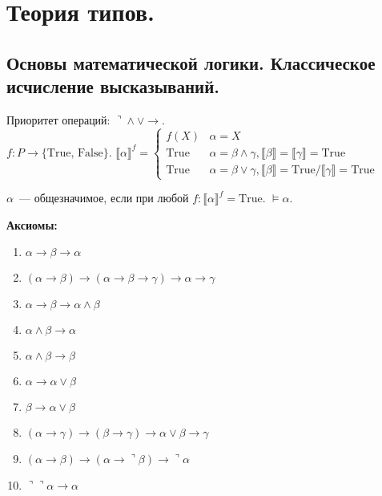 \documentclass{article}
\begin{document}
	
	
	
	
	\newpage
	\section{Теория типов.}
	\subsection{Основы математической логики. Классическое исчисление высказываний.}
	Приоритет операций: $\urcorner \wedge \vee \rightarrow$. \\
	$f: P \rightarrow \{ \text{True, False} \}$. $\llbracket \alpha \rrbracket^f =
	\begin{cases}
		f(X) & \alpha = X \\
		\text{True} & \alpha = \beta \wedge \gamma, \llbracket \beta \rrbracket = \llbracket \gamma \rrbracket = \text{True} \\
		\text{True} & \alpha = \beta \vee \gamma, \llbracket \beta \rrbracket = \text{True} / \llbracket \gamma \rrbracket = \text{True}
	\end{cases}$
	\begin{definition}
		$\alpha$~--- общезначимое, если при любой $f: \llbracket \alpha \rrbracket^f = \text{True}$. $\vDash \alpha$.
	\end{definition}
	\noindent
	\textbf{Аксиомы:}
	\begin{enumerate}
		\item $\alpha \rightarrow \beta \rightarrow \alpha$
		\item $(\alpha \rightarrow \beta) \rightarrow (\alpha \rightarrow \beta \rightarrow \gamma) \rightarrow \alpha \rightarrow \gamma$
		\item $\alpha \rightarrow \beta \rightarrow \alpha \wedge \beta$
		\item $\alpha \wedge \beta \rightarrow \alpha$
		\item $\alpha \wedge \beta \rightarrow \beta$
		\item $\alpha \rightarrow \alpha \vee \beta$
		\item $\beta \rightarrow \alpha \vee \beta$
		\item $(\alpha \rightarrow \gamma) \rightarrow (\beta \rightarrow \gamma) \rightarrow \alpha \vee \beta \rightarrow \gamma$
		\item $(\alpha \rightarrow \beta) \rightarrow (\alpha \rightarrow \urcorner \beta) \rightarrow \urcorner \alpha$
		\item $\urcorner \urcorner \alpha \rightarrow \alpha$
	\end{enumerate}
\end{document}
